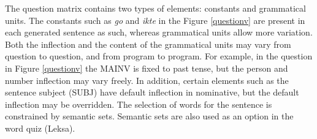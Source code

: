 \documentclass[11pt]{article}
\begin{document}
%

The question matrix contains two types of elements: constants and grammatical units. The constants such as \textit{go} and \textit{ikte} in the Figure \ref{questionv} are present in each generated sentence as such, whereas grammatical units allow more variation. Both the inflection and the content of the grammatical units may vary from question to question, and from program to program. For example, in the question in Figure \ref{questionv} the MAINV is fixed to past tense, but the person and number inflection may vary freely. In addition, certain elements such as the sentence subject (SUBJ) have default inflection in nominative, but the default inflection may be overridden. The selection of words for the sentence is constrained by semantic sets. Semantic sets are also used as an option in the word quiz (Leksa).
%
\end{document}
